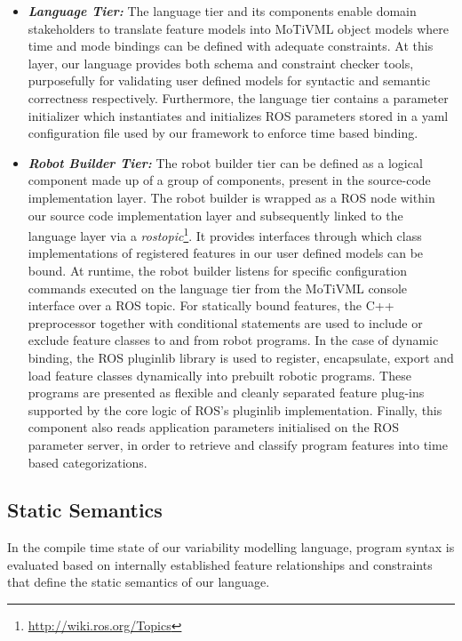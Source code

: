 \documentclass[conference]{IEEEtran}
\newcommand{\foot}[1]{\footnote{\url{#1}}}
\begin{document}
\begin{itemize}
	\item \textit{\textbf{Language Tier:}}
	The language tier and its components enable domain stakeholders to translate feature models into MoTiVML object models where time and mode bindings can be defined with adequate constraints. At this layer, our language provides both schema and constraint checker tools, purposefully for validating user defined models for syntactic and semantic correctness respectively. Furthermore, the language tier contains a parameter initializer which instantiates and initializes ROS parameters stored in a yaml configuration file used by our framework to enforce time based binding.
	\item \textit{\textbf{Robot Builder Tier:}}
	The robot builder tier can be defined as a logical component made up of a group of components, present in the source-code implementation layer. The robot builder is wrapped as a ROS node within our source code implementation layer and subsequently linked to the language layer via a \textit{rostopic}\foot{http://wiki.ros.org/Topics}. It provides interfaces through which class implementations of registered features in our user defined models can be bound. At runtime, the robot builder listens for specific configuration commands executed on the language tier from the MoTiVML console interface over a ROS topic. For statically bound features, the C++ preprocessor together with conditional statements are used to include or exclude feature classes to and from robot programs.  In the case of dynamic binding, the ROS pluginlib library is used to register, encapsulate, export and load feature classes dynamically into prebuilt robotic programs. These programs are presented as flexible and cleanly separated feature plug-ins supported by the core logic of ROS's pluginlib implementation. Finally, this component also reads application parameters initialised on the ROS parameter server, in order to retrieve and classify program features into time based categorizations. 
\end{itemize}

\subsection{Static Semantics}
In the compile time state of our variability modelling language, program syntax is evaluated based on internally established feature relationships and constraints that define the static semantics of our language.
\end{document}
